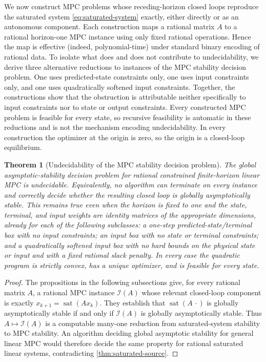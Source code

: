 \documentclass{IEEEtran}
\newtheorem{theorem}{Theorem}
\theoremstyle{remark}
\newcommand{\sat}{\operatorname{sat}}
\begin{document}
We now construct MPC problems whose receding-horizon closed loops reproduce the saturated system \eqref{eq:saturated-system} exactly, either directly or as an autonomous component.  Each construction maps a rational matrix $A$ to a rational horizon-one MPC instance using only fixed rational operations.  Hence the map is effective (indeed, polynomial-time) under standard binary encoding of rational data. To isolate what does and does not contribute to undecidability, we derive three alternative reductions to instances of the MPC stability decision problem. One uses predicted-state constraints only, one uses input constraints only, and one uses quadratically softened input constraints. Together, the constructions show that the obstruction is attributable neither specifically to input constraints nor to state or output constraints. Every constructed MPC problem is feasible for every state, so recursive feasibility is automatic in these reductions and is not the mechanism encoding undecidability. In every construction the optimizer at the origin is zero, so the origin is a closed-loop equilibrium.

\begin{theorem}[Undecidability of the MPC stability decision problem]
\label{thm:mpc-undecidability}
The global asymptotic-stability decision problem for rational constrained finite-horizon linear MPC is undecidable.  Equivalently, no algorithm can terminate on every instance and correctly decide whether the resulting closed loop is globally asymptotically stable.  This remains true even when the horizon is fixed to one and the state, terminal, and input weights are identity matrices of the appropriate dimensions, already for each of the following subclasses: a one-step predicted-state/terminal box with no input constraints; an input box with no state or terminal constraints; and a quadratically softened input box with no hard bounds on the physical state or input and with a fixed rational slack penalty.  In every case the quadratic program is strictly convex, has a unique optimizer, and is feasible for every state.
\end{theorem}

\begin{proof}
The propositions in the following subsections give, for every rational matrix $A$, a rational MPC instance $\mathcal I(A)$ whose relevant closed-loop component is exactly $x_{k+1}=\sat(Ax_k)$. They establish that $\sat(A\,\cdot)$ is globally asymptotically stable if and only if $\mathcal I(A)$ is globally asymptotically stable.
Thus $A\mapsto\mathcal I(A)$ is a computable many-one reduction from saturated-system stability to MPC stability.  An algorithm deciding global asymptotic stability for general linear MPC would therefore decide the same property for rational saturated linear systems, contradicting \cref{thm:saturated-source}.
\end{proof}
\end{document}
